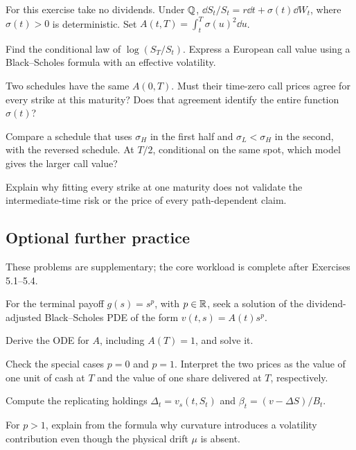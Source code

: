 \begin{exercise}
For this exercise take no dividends. Under \(\mathbb Q\),
\(\dd S_t/S_t=r\dd t+\sigma(t)\dd W_t\), where \(\sigma(t)>0\)
is deterministic. Set \(A(t,T)=\int_t^T\sigma(u)^2\dd u\).
\begin{exparts}
\item Find the conditional law of \(\log(S_T/S_t)\). Express a European call value using a Black--Scholes formula with an effective volatility.
\item Two schedules have the same \(A(0,T)\). Must their time-zero call prices agree for every strike at this maturity? Does that agreement identify the entire function \(\sigma(t)\)?
\item Compare a schedule that uses \(\sigma_H\) in the first half and \(\sigma_L<\sigma_H\) in the second, with the reversed schedule. At \(T/2\), conditional on the same spot, which model gives the larger call value?
\item Explain why fitting every strike at one maturity does not validate the intermediate-time risk or the price of every path-dependent claim.
\end{exparts}
\end{exercise}
\fi

\ifIncludeFurther
{}
\subsection*{Optional further practice}
\noindent These problems are supplementary; the core workload is complete after Exercises 5.1--5.4.
\setcounter{exercise}{4}
\begin{exercise}
For the terminal payoff \(g(s)=s^p\), with \(p\in\mathbb{R}\), seek a solution
of the dividend-adjusted Black--Scholes PDE of the form
\(v(t,s)=A(t)s^p\).
\begin{exparts}
  \item Derive the ODE for \(A\), including \(A(T)=1\), and solve it.
  \item Check the special cases \(p=0\) and \(p=1\). Interpret the two
  prices as the value of one unit of cash at \(T\) and the value of one
  share delivered at \(T\), respectively.
  \item Compute the replicating holdings
  \(\Delta_t=v_s(t,S_t)\) and
  \(\beta_t=(v-\Delta S)/B_t\).
  \item For \(p>1\), explain from the formula why curvature introduces a
  volatility contribution even though the physical drift \(\mu\) is
  absent.
\end{exparts}
\end{exercise}
\fi
